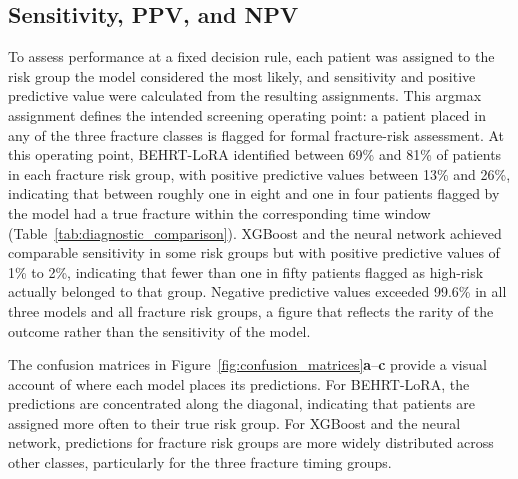 \documentclass[12pt]{article}
\begin{document}
\subsection{Sensitivity, PPV, and NPV}

To assess performance at a fixed decision rule, each patient was assigned to the risk group the model considered the most likely, and sensitivity and positive predictive value were calculated from the resulting assignments. This argmax assignment defines the intended screening operating point: a patient placed in any of the three fracture classes is flagged for formal fracture-risk assessment. At this operating point, BEHRT-LoRA identified between 69\% and 81\% of patients in each fracture risk group, with positive predictive values between 13\% and 26\%, indicating that between roughly one in eight and one in four patients flagged by the model had a true fracture within the corresponding time window (Table~\ref{tab:diagnostic_comparison}). XGBoost and the neural network achieved comparable sensitivity in some risk groups but with positive predictive values of 1\% to 2\%, indicating that fewer than one in fifty patients flagged as high-risk actually belonged to that group. Negative predictive values exceeded 99.6\% in all three models and all fracture risk groups, a figure that reflects the rarity of the outcome rather than the sensitivity of the model.

The confusion matrices in Figure~\ref{fig:confusion_matrices}\textbf{a}--\textbf{c} provide a visual account of where each model places its predictions. For BEHRT-LoRA, the predictions are concentrated along the diagonal, indicating that patients are assigned more often to their true risk group. For XGBoost and the neural network, predictions for fracture risk groups are more widely distributed across other classes, particularly for the three fracture timing groups.
\end{document}
